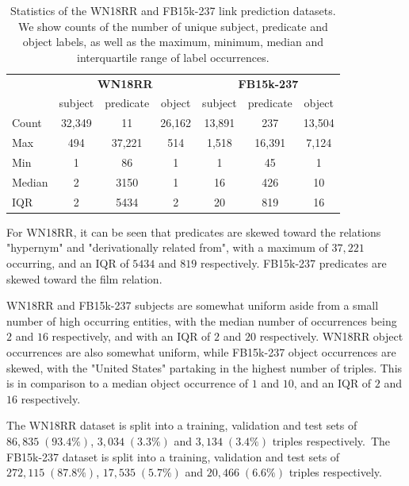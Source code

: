 \begin{table}
	\begin{center}
	\begin{tabular}{|l|ccc|ccc|}
		\hline
 		& \multicolumn{3}{c|}{\textbf{WN18RR}} & \multicolumn{3}{c|}{\textbf{FB15k-237}} \\
		& subject & predicate & object & subject & predicate & object \\
		\hline 
		Count & 32,349 & 11 & 26,162 & 13,891 & 237 & 13,504 \\
		Max & 494 & 37,221 & 514 & 1,518 & 16,391 & 7,124 \\
		Min & 1 & 86 & 1 & 1 & 45 & 1 \\
		Median & 2 & 3150 & 1 & 16 & 426 & 10 \\
		IQR & 2 & 5434 & 2 & 20 & 819 & 16 \\
		\hline 
	\end{tabular}
	\end{center}
	\captionsetup{justification=centering}
	\caption{Statistics of the WN18RR and FB15k-237 link prediction datasets. We show counts of the number of unique subject, predicate and object labels, as well as the maximum, minimum, median and interquartile range of label occurrences.}
\end{table}

\noindent For WN18RR, it can be seen that predicates are skewed toward the relations "hypernym" and "derivationally related from", with a maximum of $ 37, 221 $ occurring, and an IQR of $ 5434 $ and $ 819 $ respectively. FB15k-237 predicates are skewed toward the film relation. \par

\noindent WN18RR and FB15k-237 subjects are somewhat uniform aside from a small number of high occurring entities, with the median number of occurrences being $ 2 $ and $ 16 $ respectively, and with an IQR of $ 2 $ and $ 20 $ respectively. WN18RR object occurrences are also somewhat uniform, while FB15k-237 object occurrences are skewed, with the "United States" partaking in the highest number of triples. This is in comparison to a median object occurrence of $ 1 $ and $ 10 $, and an IQR of $ 2 $ and $ 16 $ respectively. \par

\noindent The WN18RR dataset is split into a training, validation and test sets of $ 86, 835 \; (93.4 \%) $, $ 3, 034 \; (3.3 \%) $ and $ 3, 134\; (3.4 \%) $ triples respectively.\ The FB15k-237 dataset is split into a training, validation and test sets of $ 272, 115 \; (87.8 \%) $, $ 17, 535 \; (5.7 \%) $ and $ 20, 466 \; (6.6 \%) $ triples respectively. \par


